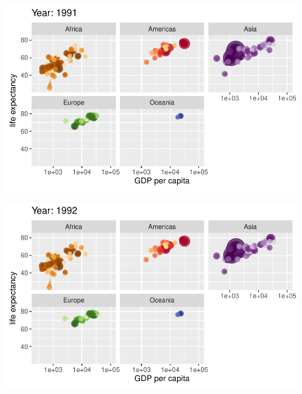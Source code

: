 \documentclass[
  letterpaper,
  DIV=11,
  numbers=noendperiod]{scrartcl}
\begin{document}
\begin{figure}[H]

{\centering \includegraphics{class05_files/figure-pdf/unnamed-chunk-24-72.pdf}

}

\end{figure}

\begin{figure}[H]

{\centering \includegraphics{class05_files/figure-pdf/unnamed-chunk-24-73.pdf}

}

\end{figure}
\end{document}

